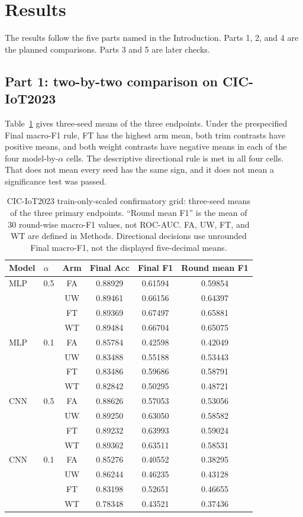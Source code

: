 \documentclass{ieeeaccess}
\begin{document}
\section{Results}
The results follow the five parts named in the Introduction. Parts 1, 2, and 4 are the planned comparisons. Parts 3 and 5 are later checks.

\subsection{Part 1: two-by-two comparison on CIC-IoT2023}
Table~\ref{tab:cic} gives three-seed means of the three endpoints. Under the prespecified Final macro-F1 rule, FT has the highest arm mean, both trim contrasts have positive means, and both weight contrasts have negative means in each of the four model-by-$\alpha$ cells. The descriptive directional rule is met in all four cells. That does not mean every seed has the same sign, and it does not mean a significance test was passed.

\begin{table}[!t]
\centering
\caption{CIC-IoT2023 train-only-scaled confirmatory grid: three-seed means of the three primary endpoints. ``Round mean F1'' is the mean of 30 round-wise macro-F1 values, not ROC-AUC. FA, UW, FT, and WT are defined in Methods. Directional decisions use unrounded Final macro-F1, not the displayed five-decimal means.}
\label{tab:cic}
\small
\begin{tabular}{llcccc}
\hline
Model & $\alpha$ & Arm & Final Acc & Final F1 & Round mean F1 \\
\hline
MLP & 0.5 & FA & 0.88929 & 0.61594 & 0.59854 \\
    &     & UW & 0.89461 & 0.66156 & 0.64397 \\
    &     & FT & 0.89369 & 0.67497 & 0.65881 \\
    &     & WT & 0.89484 & 0.66704 & 0.65075 \\
MLP & 0.1 & FA & 0.85784 & 0.42598 & 0.42049 \\
    &     & UW & 0.83488 & 0.55188 & 0.53443 \\
    &     & FT & 0.83486 & 0.59686 & 0.58791 \\
    &     & WT & 0.82842 & 0.50295 & 0.48721 \\
CNN & 0.5 & FA & 0.88626 & 0.57053 & 0.53056 \\
    &     & UW & 0.89250 & 0.63050 & 0.58582 \\
    &     & FT & 0.89232 & 0.63993 & 0.59024 \\
    &     & WT & 0.89362 & 0.63511 & 0.58531 \\
CNN & 0.1 & FA & 0.85276 & 0.40552 & 0.38295 \\
    &     & UW & 0.86244 & 0.46235 & 0.43128 \\
    &     & FT & 0.83198 & 0.52651 & 0.46655 \\
    &     & WT & 0.78348 & 0.43521 & 0.37436 \\
\hline
\end{tabular}
\end{table}
\end{document}
